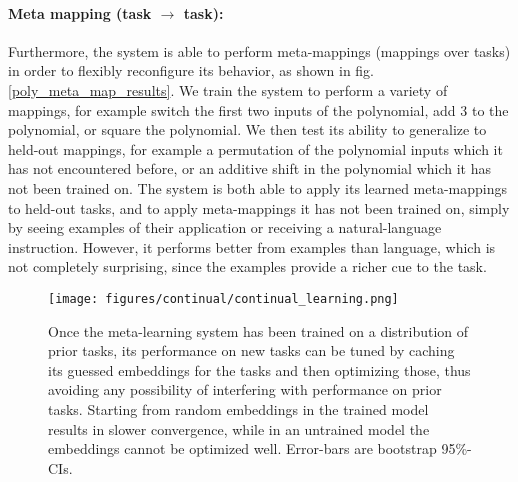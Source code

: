 \documentclass{article}
\begin{document}
\paragraph{Meta mapping (task $\rightarrow$ task):} Furthermore, the system is able to perform meta-mappings (mappings over tasks) in order to flexibly reconfigure its behavior, as shown in fig. \ref{poly_meta_map_results}. We train the system to perform a variety of mappings, for example switch the first two inputs of the polynomial, add 3 to the polynomial, or square the polynomial. We then test its ability to generalize to held-out mappings, for example a permutation of the polynomial inputs which it has not encountered before, or an additive shift in the polynomial which it has not been trained on. The system is both able to apply its learned meta-mappings to held-out tasks, and to apply meta-mappings it has not been trained on, simply by seeing examples of their application or receiving a natural-language instruction. However, it performs better from examples than language, which is not completely surprising, since the examples provide a richer cue to the task. \par 
\begin{figure}
\centering
\texttt{[image: figures/continual/continual\_learning.png]}
\caption{Once the meta-learning system has been trained on a distribution of prior tasks, its performance on new tasks can be tuned by caching its guessed embeddings for the tasks and then optimizing those, thus avoiding any possibility of interfering with performance on prior tasks. Starting from random embeddings in the trained model results in slower convergence, while in an untrained model the embeddings cannot be optimized well. Error-bars are bootstrap 95\%-CIs.}
\label{poly_continual_results}
\end{figure}
\vspace{-0.7em}
\end{document}
